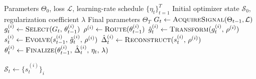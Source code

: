 \begin{algorithm}[!t]
\caption{Universal Meta-Pipeline for Modern Optimizer Updates.}
\label{alg:meta_optimizer}
\begin{algorithmic}[1]
  \Require Parameters $\Theta_0$, loss $\mathcal{L}$, 
           learning-rate schedule $\{\eta_t\}_{t=1}^T$
  \Require Initial optimizer state $\mathcal{S}_0$, 
           regularization coefficient $\lambda$
  \Ensure  Final parameters $\Theta_T$
    \State \textcolor{famS0}{$G_t \gets \textsc{AcquireSignal}(\Theta_{t-1}, \mathcal{L})$
      }
      \State $g_t^{(i)} \gets \textsc{Select}(G_t,\,\theta^{(i)}_{t-1})$
      \State \textcolor{famS1}{$\rho^{(i)} \gets \textsc{Route}(\theta^{(i)}_{t-1})$ 
        }
      \State \textcolor{famS2}{$\hat{g}_t^{(i)} \gets \textsc{Transform}(g_t^{(i)},\,\rho^{(i)})$ 
        }
      \State \textcolor{famS3}{$s_t^{(i)} \gets \textsc{Evolve}(s^{(i)}_{t-1},\,\hat{g}_t^{(i)},\,\rho^{(i)})$ 
        }
      \State \textcolor{famS4}{$\hat{\Delta}_t^{(i)} \gets \textsc{Reconstruct}(s_t^{(i)},\,\rho^{(i)})$ 
        }
      \State \textcolor{famS5}{$\theta_t^{(i)} \gets \textsc{Finalize}(\theta^{(i)}_{t-1},\,\hat{\Delta}_t^{(i)},\,\eta_t,\,\lambda)$ 
        }
        
    \EndFor
    \State $\mathcal{S}_t \gets \{s_t^{(i)}\}_i$
  \EndFor
\end{algorithmic}
\end{algorithm}